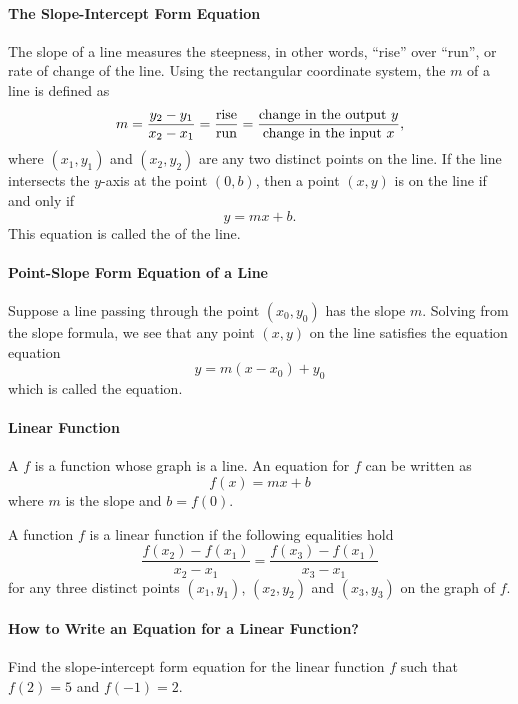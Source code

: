 
\paragraph*{The Slope-Intercept Form Equation}
	The slope of a line measures the steepness, in other words, ``rise'' over ``run'', or rate of change of the line. Using the rectangular coordinate  system, the  $m$ of a line is defined as
	$$
	m=\dfrac{y_2-y_1}{x_2-x_1}=\dfrac{\textup{rise}}{\textup{run}}=\dfrac{\text{change in the output }y}{\text{change in the input } x},
	$$
	where $(x_1, y_1)$ and $(x_2, y_2)$ are any two distinct points on the line. If the line intersects the $y$-axis at the point $(0, b)$, then a point $(x, y)$ is on the line if and only if
	$$
	y=mx+b.
	$$
	This equation is called the  of the line.


\paragraph*{Point-Slope Form Equation of a Line}

		Suppose a line passing through the point $(x_0, y_0)$ has the slope $m$. Solving from the slope formula, we see that any point $(x, y)$ on the line satisfies the equation equation
		$$
		y=m(x-x_0)+y_0
		$$
		which is called the  equation.

\paragraph*{Linear Function}

	A  $f$ is a function whose graph is a line. An equation for $f$ can be written as
	$$f(x) = mx + b$$
	where $m$ is the slope and $b=f(0)$.

	A function $f$ is a linear function if the following equalities hold
	$$
	\dfrac{f(x_2)-f(x_1)}{x_2-x_1}
	=\dfrac{f(x_3)-f(x_1)}{x_3-x_1}
	$$
	for any three distinct points $(x_1, y_1)$, $(x_2, y_2)$ and $(x_3, y_3)$ on the graph of $f$.



\paragraph*{How to Write an Equation for a Linear Function?}

\mbox{}

	\begin{example}
		Find the slope-intercept form equation for the linear function $f$ such that $f(2)=5$ and $f(-1) = 2$.
	\end{example}

